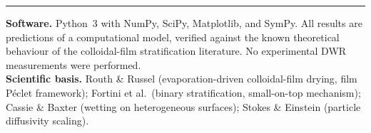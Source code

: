 \documentclass[11pt,a4paper]{article}
\begin{document}
\vspace{8pt}
\hrule
\vspace{6pt}
{\small
\textbf{Software.}
Python~3 with NumPy, SciPy, Matplotlib, and SymPy.
All results are predictions of a computational model, verified against the
known theoretical behaviour of the colloidal-film stratification literature.
No experimental DWR measurements were performed.\\[3pt]
\textbf{Scientific basis.}
Routh \& Russel (evaporation-driven colloidal-film drying, film P\'{e}clet
framework);
Fortini et al.\ (binary stratification, small-on-top mechanism);
Cassie \& Baxter (wetting on heterogeneous surfaces);
Stokes \& Einstein (particle diffusivity scaling).
}
\end{document}
